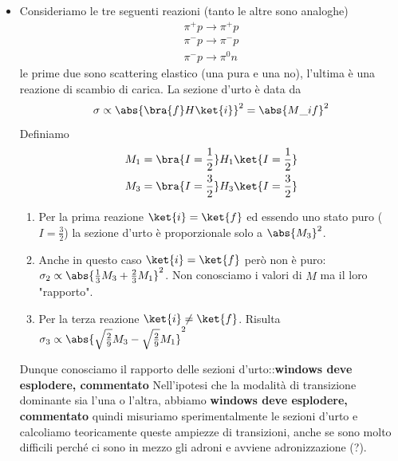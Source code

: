 \begin{itemize}
    \item Consideriamo le tre seguenti reazioni (tanto le altre sono analoghe)
    \begin{gather*}
        \pi^+p\to\pi^+p\\
        \pi^-p\to\pi^-p\\
        \pi^-p\to\pi^0n
    \end{gather*}
    le prime due sono scattering elastico (una pura e una no), l'ultima è una reazione di scambio di carica. La sezione d'urto è data da
    \begin{equation*}
        \sigma\propto\abs{\bra{f}H\ket{i}}^2=\abs{M\_{if}}^2
    \end{equation*}
    Definiamo
    \begin{gather*}
        M_1=\bra{I=\frac12}H_1\ket{I=\frac12}\\
        M_3=\bra{I=\frac32}H_3\ket{I=\frac32}
    \end{gather*}
    \begin{enumerate}
        \item Per la prima reazione $\ket{i}=\ket{f}$ ed essendo uno stato puro ($I=\frac32$) la sezione d'urto è proporzionale solo a $\abs{M_3}^2$. 
        \item Anche in questo caso $\ket{i}=\ket{f}$ però non è puro: $\sigma_2\propto \abs{\frac13M_3+\frac23M_1}^2$. Non conosciamo i valori di $M$ ma il loro "rapporto".
        \item Per la terza reazione $\ket{i}\neq\ket{f}$. Risulta $\sigma_3\propto\abs{\sqrt{\frac29}M_3-\sqrt{\frac29}M_1}^2$
    \end{enumerate}
    Dunque conosciamo il rapporto delle sezioni d'urto::\textbf{windows deve esplodere, commentato}
    Nell'ipotesi che la modalità di transizione dominante sia l'una o l'altra, abbiamo \textbf{windows deve esplodere, commentato}
    quindi misuriamo sperimentalmente le sezioni d'urto e calcoliamo teoricamente queste ampiezze di transizioni, anche se sono molto difficili perché ci sono in mezzo gli adroni e avviene adronizzazione (?).

\end{itemize}
